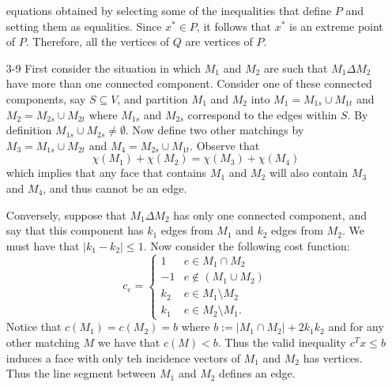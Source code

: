 \documentclass[12pt]{article}
\begin{document}
\begin{enumerate}
equations obtained by selecting some of the inequalities that define
$P$ and setting them as equalities. Since $x^* \in P$, it follows that
$x^*$ is an extreme point of $P$. Therefore, all the vertices of $Q$
are vertices of $P$.
\fi
\item[3-9]
First consider the situation in which $M_1$ and $M_2$ are such that
$M_1\Delta M_2$ have more than one connected component. Consider one
of these connected components, say $S\subseteq V$, and partition $M_1$
and $M_2$ into $M_1=M_{1s}\cup M_{1t}$ and $M_2=M_{2s}\cup M_{2t}$
where $M_{1s}$ and $M_{2s}$ correspond to the edges within $S$. By
definition $M_{1s}\cup M_{2s}\neq \emptyset$. Now define two other
matchings by $M_3=M_{1s}\cup M_{2t}$ and $M_4=M_{2s}\cup
M_{1t}$. Observe that 
$$\chi(M_1) + \chi(M_2) = \chi(M_3)+\chi(M_4)$$
which implies that any face that contains $M_1$ and $M_2$ will also
contain $M_3$ and $M_4$, and thus cannot be an edge. 


Conversely, suppose that $M_1\Delta M_2$ has only one connected
component, and say that this component has $k_1$ edges from $M_1$ and
$k_2$ edges from $M_2$. We must have that $|k_1-k_2|\leq 1$. Now
consider the following cost function:
$$c_e=\left\{ \begin{array}{ll} 1 & e\in M_1\cap M_2 \\ -1 & e\notin
  (M_1\cup M_2) \\ k_2 & e\in M_1\setminus M_2 \\ k_1 & e\in
  M_2\setminus M_1.\end{array}\right.$$  Notice that $c(M_1)=c(M_2)=b$
where $b:=|M_1\cap M_2| + 2 k_1k_2$ and for any other matching $M$ we
have that $c(M)<b$. Thus the valid inequality $c^Tx \leq b$ induces a
face with only teh incidence vectors of $M_1$ and $M_2$ has
  vertices. Thus the line segment between $M_1$ and $M_2$ defines an
  edge. 


\end{enumerate}
\end{document}
